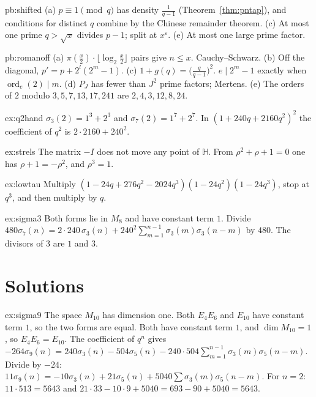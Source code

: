 \begin{hint}{pb:shifted}
(a) $p\equiv1\pmod q$ has density $\frac1{q-1}$ (Theorem~\ref{thm:pntap}), and conditions for distinct $q$ combine by the Chinese remainder theorem. (c) At most one prime
$q>\sqrt x$ divides $p-1$; split at $x^\varepsilon$. (e) At most one large prime factor.
\end{hint}

\begin{hint}{pb:romanoff}
(a) $\pi(\frac x2)\cdot\lfloor\log_2\frac x2\rfloor$ pairs give $n\le x$. Cauchy--Schwarz. (b) Off the diagonal, $p'=p+2^l(2^m-1)$. (c) $1+g(q)=\bigl(\frac q{q-1}\bigr)^2$.
$e\mid2^m-1$ exactly when $\operatorname{ord}_e(2)\mid m$. (d) $P_J$ has fewer than $J^2$ prime factors; Mertens. (e) The orders of $2$ modulo $3,5,7,13,17,241$ are
$2,4,3,12,8,24$.
\end{hint}


\begin{hint}{ex:q2hand}
$\sigma_3(2)=1^3+2^3$ and $\sigma_7(2)=1^7+2^7$. In $(1+240q+2160q^2)^2$ the coefficient of $q^2$ is $2\cdot2160+240^2$.
\end{hint}

\begin{hint}{ex:strels}
The matrix $-I$ does not move any point of $\mathbb H$. From $\rho^2+\rho+1=0$ one has $\rho+1=-\rho^2$, and $\rho^3=1$.
\end{hint}

\begin{hint}{ex:lowtau}
Multiply $(1-24q+276q^2-2024q^3)(1-24q^2)(1-24q^3)$, stop at $q^3$, and then multiply by $q$.
\end{hint}

\begin{hint}{ex:sigma3}
Both forms lie in $M_8$ and have constant term $1$. Divide $480\sigma_7(n)=2\cdot240\,\sigma_3(n)+240^2\sum_{m=1}^{n-1}\sigma_3(m)\sigma_3(n-m)$ by $480$. The divisors of $3$ are $1$ and $3$.
\end{hint}

\section{Solutions}

\begin{solution}{ex:sigma9}
\idea The space $M_{10}$ has dimension one. Both $E_4E_6$ and $E_{10}$ have constant term $1$, so the two forms are equal.
\writeup Both have constant term $1$, and $\dim M_{10}=1$, so $E_4E_6=E_{10}$. The coefficient of $q^n$ gives
$-264\sigma_9(n)=240\sigma_3(n)-504\sigma_5(n)-240\cdot504\sum_{m=1}^{n-1}\sigma_3(m)\sigma_5(n-m)$. Divide by $-24$: $11\sigma_9(n)=-10\sigma_3(n)+21\sigma_5(n)+5040\sum\sigma_3(m)\sigma_5(n-m)$. For $n=2$: $11\cdot513=5643$ and
$21\cdot33-10\cdot9+5040=693-90+5040=5643$.
\end{solution}


